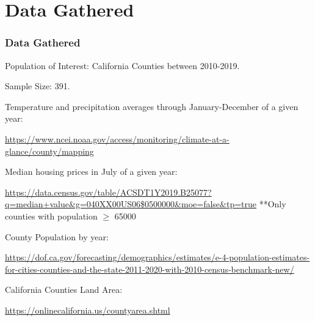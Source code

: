 \documentclass{beamer}
\begin{document}
\section{Data Gathered}
\begin{frame}
\frametitle{Data Gathered}
    \pause
    {\footnotesize Population of Interest: California Counties between 2010-2019.} 
    
    {\footnotesize Sample Size: 391.}    
    \pause  
    \vspace{10pt}

    {\footnotesize Temperature and precipitation averages through January-December of a given year:}
    
    {\tiny \url{https://www.ncei.noaa.gov/access/monitoring/climate-at-a-glance/county/mapping}}
    \pause 
    \vspace{10pt}

    {\footnotesize Median housing prices in July of a given year:}

    {\tiny \url{https://data.census.gov/table/ACSDT1Y2019.B25077?q=median+value&g=040XX00US06$0500000&moe=false&tp=true}}
    {\tiny ***Only counties with population $\geq$ 65000}
    \pause
    \vspace{10pt}

    {\footnotesize County Population by year:}

    {\tiny \url{https://dof.ca.gov/forecasting/demographics/estimates/e-4-population-estimates-for-cities-counties-and-the-state-2011-2020-with-2010-census-benchmark-new/}}
    \pause
    \vspace{10pt}

    {\footnotesize California Counties Land Area:}

    {\tiny \url{https://onlinecalifornia.us/countyarea.shtml}}

\end{frame}
\end{document}
